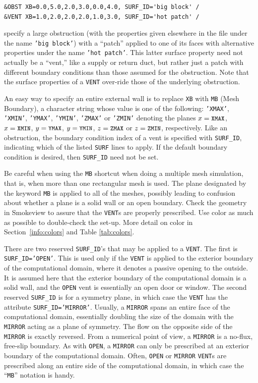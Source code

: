 \documentclass[11pt]{book}
\newcommand{\ct}{\tt\small}
\begin{document}
\footnotesize
\begin{verbatim}
&OBST XB=0.0,5.0,2.0,3.0,0.0,4.0, SURF_ID='big block' /
&VENT XB=1.0,2.0,2.0,2.0,1.0,3.0, SURF_ID='hot patch' /
\end{verbatim} \normalsize

\noindent
specify a large obstruction (with the properties given elsewhere in the file under the name {\ct 'big block'}) with
a ``patch'' applied to one of its faces with alternative properties under the name {\ct 'hot patch'}. This latter
surface property need not actually be a ``vent,'' like a supply or return duct, but rather just a patch with different boundary
conditions than those assumed for the obstruction. Note that the surface properties of a {\ct VENT} over-ride those of the
underlying obstruction.

An easy way to specify an entire external wall is to replace {\ct XB} with
{\ct MB} (Mesh Boundary), a character string whose value is one of the following:
{\ct 'XMAX'}, {\ct 'XMIN'}, {\ct 'YMAX'}, {\ct 'YMIN'}, {\ct 'ZMAX'} or
{\ct 'ZMIN'} denoting the planes $x=\hbox{\ct XMAX}$, $x=\hbox{\ct XMIN}$,
$y=\hbox{\ct YMAX}$, $y=\hbox{\ct YMIN}$, $z=\hbox{\ct ZMAX}$
or $z=\hbox{\ct ZMIN}$, respectively.
Like an obstruction, the boundary condition index of a vent is specified
with {\ct SURF\_ID}, indicating which of the listed {\ct SURF} lines to
apply. If the default boundary condition is desired, then {\ct SURF\_ID} need not be set.

Be careful when using the {\ct MB} shortcut when doing a multiple mesh
simulation, that is, when more than one rectangular mesh is used. The
plane designated by the keyword {\ct MB} is applied to all of the
meshes, possibly leading to confusion about whether a plane is a solid
wall or an open boundary. Check the geometry in Smokeview to assure that
the {\ct VENT}s are properly prescribed. Use color as much as
possible to double-check the set-up.  More detail on color in
Section~\ref{info:colors} and Table \ref{tab:colors}.

There are two reserved {\ct SURF\_ID}'s that may be applied to a {\ct VENT}.
The first is {\ct SURF\_ID='OPEN'}. This is used only if the {\ct VENT}
is applied to the exterior boundary of the computational domain, where
it denotes a passive opening to the outside. It is assumed here that
the exterior boundary of the computational domain is a solid wall, and
the {\ct OPEN} vent is essentially an open door or window.
The second reserved {\ct SURF\_ID} is for a symmetry plane, in which
case the {\ct VENT} has the attribute {\ct SURF\_ID='MIRROR'}.
Usually, a {\ct MIRROR} spans an entire face of the computational
domain, essentially doubling the size of the domain with the {\ct MIRROR}
acting as a plane of symmetry. The flow on the opposite side of the
{\ct MIRROR} is exactly reversed. From a numerical point of view,
a {\ct MIRROR} is a no-flux, free-slip boundary.
As with {\ct OPEN}, a {\ct MIRROR} can only be prescribed at an
exterior boundary of the computational domain.
Often, {\ct OPEN} or {\ct MIRROR} {\ct VENT}s are prescribed along an
entire side of the computational domain, in which case the ``{\ct MB}''
notation is handy.
\end{document}
